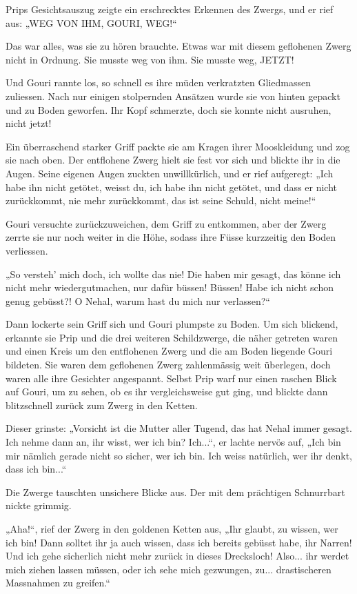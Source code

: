 \documentclass[10pt, a4paper, oneside]{book}
\begin{document}
Prips Gesichtsauszug zeigte ein erschrecktes Erkennen des Zwergs, und er rief aus: „WEG VON IHM, GOURI, WEG!“

Das war alles, was sie zu hören brauchte. Etwas war mit diesem geflohenen Zwerg nicht in Ordnung. Sie musste weg von ihm. Sie musste weg, JETZT!

Und Gouri rannte los, so schnell es ihre müden verkratzten Gliedmassen zuliessen. Nach nur einigen stolpernden Ansätzen wurde sie von hinten gepackt und zu Boden geworfen. Ihr Kopf schmerzte, doch sie konnte nicht ausruhen, nicht jetzt!

Ein überraschend starker Griff packte sie am Kragen ihrer Mooskleidung und zog sie nach oben. Der entflohene Zwerg hielt sie fest vor sich und blickte ihr in die Augen. Seine eigenen Augen zuckten unwillkürlich, und er rief aufgeregt: „Ich habe ihn nicht getötet, weisst du, ich habe ihn nicht getötet, und dass er nicht zurückkommt, nie mehr zurückkommt, das ist seine Schuld, nicht meine!“

Gouri versuchte zurückzuweichen, dem Griff zu entkommen, aber der Zwerg zerrte sie nur noch weiter in die Höhe, sodass ihre Füsse kurzzeitig den Boden verliessen.

„So versteh’ mich doch, ich wollte das nie! Die haben mir gesagt, das könne ich nicht mehr wiedergutmachen, nur dafür büssen! Büssen! Habe ich nicht schon genug gebüsst?! O Nehal, warum hast du mich nur verlassen?“

Dann lockerte sein Griff sich und Gouri plumpste zu Boden. Um sich blickend, erkannte sie Prip und die drei weiteren Schildzwerge, die näher getreten waren und einen Kreis um den entflohenen Zwerg und die am Boden liegende Gouri bildeten. Sie waren dem geflohenen Zwerg zahlenmässig weit überlegen, doch waren alle ihre Gesichter angespannt. Selbst Prip warf nur einen raschen Blick auf Gouri, um zu sehen, ob es ihr vergleichsweise gut ging, und blickte dann blitzschnell zurück zum Zwerg in den Ketten.

Dieser grinste: „Vorsicht ist die Mutter aller Tugend, das hat Nehal immer gesagt. Ich nehme dann an, ihr wisst, wer ich bin? Ich...“, er lachte nervös auf, „Ich bin mir nämlich gerade nicht so sicher, wer ich bin. Ich weiss natürlich, wer ihr denkt, dass ich bin...“

Die Zwerge tauschten unsichere Blicke aus. Der mit dem prächtigen Schnurrbart nickte grimmig.

„Aha!“, rief der Zwerg in den goldenen Ketten aus, „Ihr glaubt, zu wissen, wer ich bin! Dann solltet ihr ja auch wissen, dass ich bereits gebüsst habe, ihr Narren! Und ich gehe sicherlich nicht mehr zurück in dieses Drecksloch! Also... ihr werdet mich ziehen lassen müssen, oder ich sehe mich gezwungen, zu... drastischeren Massnahmen zu greifen.“
\end{document}
